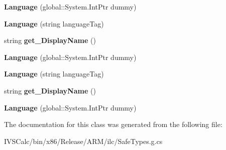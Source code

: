 \begin{DoxyCompactItemize}
{\bfseries Language} (global\+::\+System.\+Int\+Ptr dummy)
\item 
\mbox{\label{class_windows_1_1_globalization_1_1_language_adc78bb9e67504afa46971d09ed677c33}} 
{\bfseries Language} (string language\+Tag)
\item 
\mbox{\label{class_windows_1_1_globalization_1_1_language_a2d9333961caf5ad3a8429dce65f58630}} 
string {\bfseries get\+\_\+\+Display\+Name} ()
\item 
\mbox{\label{class_windows_1_1_globalization_1_1_language_a584f52c07f8dda8334add323c9a89a57}} 
{\bfseries Language} (global\+::\+System.\+Int\+Ptr dummy)
\item 
\mbox{\label{class_windows_1_1_globalization_1_1_language_adc78bb9e67504afa46971d09ed677c33}} 
{\bfseries Language} (string language\+Tag)
\item 
\mbox{\label{class_windows_1_1_globalization_1_1_language_a2d9333961caf5ad3a8429dce65f58630}} 
string {\bfseries get\+\_\+\+Display\+Name} ()
\item 
\mbox{\label{class_windows_1_1_globalization_1_1_language_a584f52c07f8dda8334add323c9a89a57}} 
{\bfseries Language} (global\+::\+System.\+Int\+Ptr dummy)
\end{DoxyCompactItemize}


The documentation for this class was generated from the following file\+:\begin{DoxyCompactItemize}
\item 
I\+V\+S\+Calc/bin/x86/\+Release/\+A\+R\+M/ilc/Safe\+Types.\+g.\+cs\end{DoxyCompactItemize}
